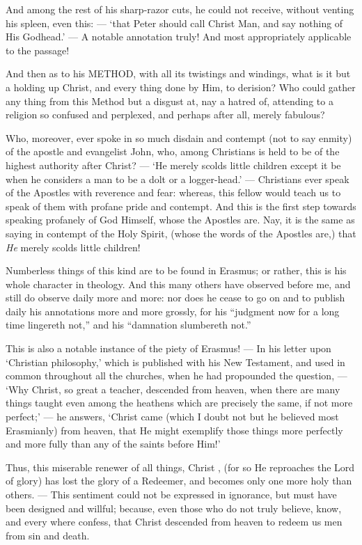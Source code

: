 And among the rest of his sharp-razor cuts, he could not receive, without venting his spleen, even this: — ‘that Peter should call Christ Man, and say nothing of His Godhead.’ — A notable annotation truly! And most appropriately applicable to the passage!

And then as to his \textsc{METHOD}, with all its twistings and windings, what is it but a holding up Christ, and every thing done by Him, to derision? Who could gather any thing from this Method but a disgust at, nay a hatred of, attending to a religion so confused and perplexed, and perhaps after all, merely fabulous?

Who, moreover, ever spoke in so much disdain and contempt (not to say enmity) of the apostle and evangelist John, who, among Christians is held to be of the highest authority after Christ? — ‘He merely scolds little children except it be when he considers a man to be a dolt or a logger-head.’ — Christians ever speak of the Apostles with reverence and fear: whereas, this fellow would teach us to speak of them with profane pride and contempt. And this is the first step towards speaking profanely of God Himself, whose the Apostles are. Nay, it is the same as saying in contempt of the Holy Spirit, (whose the words of the Apostles are,) that \emph{He }merely scolds little children!

Numberless things of this kind are to be found in Erasmus; or rather, this is his whole character in theology. And this many others have observed before me, and still do observe daily more and more: nor does he cease to go on and to publish daily his annotations more and more grossly, for his “judgment now for a long time lingereth not,” and his “damnation slumbereth not.”

This is also a notable instance of the piety of Erasmus! — In his letter upon ‘Christian philosophy,’ which is published with his New Testament, and used in common throughout all the churches, when he had propounded the question, — ‘Why Christ, so great a teacher, descended from heaven, when there are many things taught even among the heathens which are precisely the same, if not more perfect;’ — he answers, ‘Christ came (which I doubt not but he believed most Erasmianly) from heaven, that He might exemplify those things more perfectly and more fully than any of the saints before Him!’

Thus, this miserable renewer of all things, Christ , (for so He reproaches the Lord of glory) has lost the glory of a Redeemer, and becomes only one more holy than others. — This sentiment could not be expressed in ignorance, but must have been designed and willful; because, even those who do not truly believe, know, and every where confess, that Christ descended from heaven to redeem us men from sin and death.

